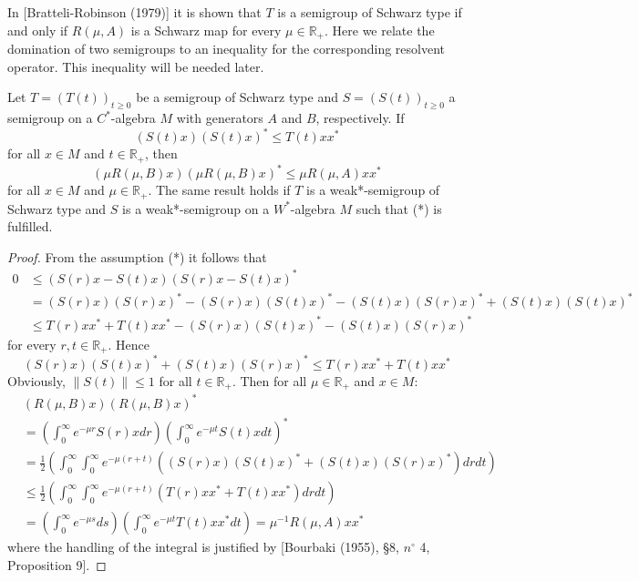 In [Bratteli-Robinson (1979)] it is shown that $T$ is a semigroup of Schwarz type if and only if $R(\mu, A)$ is a Schwarz map for every $\mu \in \mathbb{R}_{+}$.
Here we relate the domination of two semigroups to an inequality for the corresponding resolvent operator.
This inequality will be needed later.
\begin{theorem}
Let $T=(T(t))_{t \geq 0}$ be a semigroup of Schwarz type and $S=(S(t))_{t \geq 0}$ a semigroup on a $C^{*}$-algebra $M$ with generators $A$ and $B$, respectively.
If 
\[
(S(t)x)(S(t)x)^{*} \leq T(t)xx^{*}
\]
for all $x \in M$ and $t \in \mathbb{R}_{+}$, then
\[
(\mu R(\mu, B)x)(\mu R(\mu, B)x)^{*} \leq \mu R(\mu, A)xx^{*}
\]
for all $x \in M$ and $\mu \in \mathbb{R}_{+}$.
The same result holds if $T$ is a weak*-semigroup of Schwarz type and $S$ is a weak*-semigroup on a $W^{*}$-algebra $M$ such that (*) is fulfilled.
\end{theorem}
\begin{proof}
From the assumption (*) it follows that
\begin{align*}
0 &\leq (S(r)x - S(t)x)(S(r)x - S(t)x)^{*} \\
&= (S(r)x)(S(r)x)^{*} - (S(r)x)(S(t)x)^{*} - (S(t)x)(S(r)x)^{*} + (S(t)x)(S(t)x)^{*} \\
&\leq T(r)xx^{*} + T(t)xx^{*} - (S(r)x)(S(t)x)^{*} - (S(t)x)(S(r)x)^{*}
\end{align*}
for every $r,t \in \mathbb{R}_{+}$.
Hence
\[
(S(r)x)(S(t)x)^{*} + (S(t)x)(S(r)x)^{*} \leq T(r)xx^{*} + T(t)xx^{*}
\]
Obviously, $\|S(t)\| \leq 1$ for all $t \in \mathbb{R}_{+}$.
Then for all $\mu \in \mathbb{R}_{+}$ and $x \in M$:
\begin{align*}
&(R(\mu, B)x)(R(\mu, B)x)^{*} \\
&= \left(\int_{0}^{\infty} e^{-\mu r} S(r)x dr\right)\left(\int_{0}^{\infty} e^{-\mu t} S(t)x dt\right)^{*} \\
&= \frac{1}{2}\left(\int_{0}^{\infty} \int_{0}^{\infty} e^{-\mu(r+t)}((S(r)x)(S(t)x)^{*} + (S(t)x)(S(r)x)^{*}) dr dt\right) \\
&\leq \frac{1}{2}\left(\int_{0}^{\infty} \int_{0}^{\infty} e^{-\mu(r+t)}(T(r)xx^{*} + T(t)xx^{*}) dr dt\right) \\
&= \left(\int_{0}^{\infty} e^{-\mu s} ds\right)\left(\int_{0}^{\infty} e^{-\mu t} T(t)xx^{*} dt\right) = \mu^{-1} R(\mu, A)xx^{*}
\end{align*}
where the handling of the integral is justified by [Bourbaki (1955), §8, $n^{\circ}$ 4, Proposition 9].
\end{proof}

